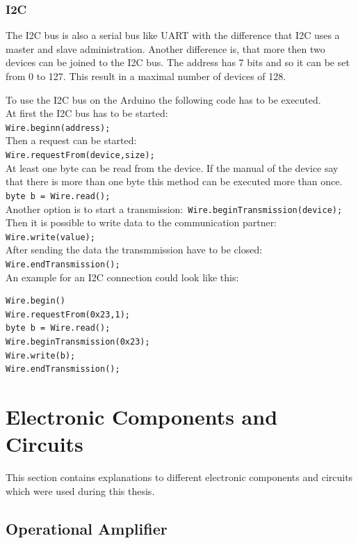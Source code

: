 \subsubsection{I2C}\label{sec:i2c}
The I2C bus is also a serial bus like UART with the difference that I2C uses a master and slave administration.
Another difference is, that more then two devices can be joined to the I2C bus.
The address has 7 bits and so it can be set from 0 to 127.
This result in a maximal number of devices of 128.

To use the I2C bus on the Arduino the following code has to be executed.\\
At first the I2C bus has to be started: \\
\lstinline|Wire.beginn(address);| \\
Then a request can be started: \\
\lstinline|Wire.requestFrom(device,size);| \\
At least one byte can be read from the device.
If the manual of the device say that there is more than one byte this method can be executed more than once. \\
\lstinline|byte b = Wire.read();| \\
Another option is to start a transmission:\
\lstinline|Wire.beginTransmission(device);| \\
Then it is possible to write data to the communication partner:\\
\lstinline|Wire.write(value);|\\
After sending the data the transmmission have to be closed:\\
\lstinline|Wire.endTransmission();|\\
An example for an I2C connection could look like this:\\
\begin{lstlisting}
Wire.begin()
Wire.requestFrom(0x23,1);
byte b = Wire.read();
Wire.beginTransmission(0x23);
Wire.write(b);
Wire.endTransmission();
\end{lstlisting}


\section{Electronic Components and Circuits}\label{sec:electronicCircuits}
This section contains explanations to different electronic components and circuits which were used during this thesis.


\subsection{Operational Amplifier}\label{sec:operationalAmplifier}


